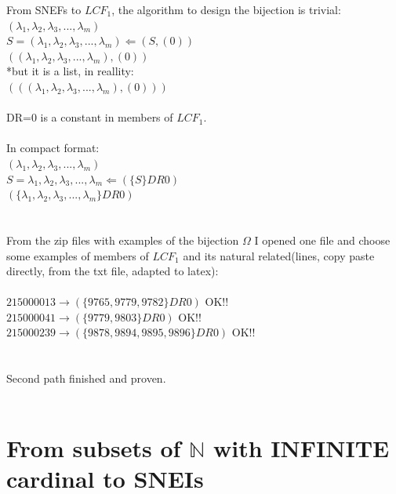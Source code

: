 		\noindent
		From SNEFs to $LCF_{1}$, the algorithm to design the bijection is trivial:\\
		$(\lambda_{1}, \lambda_{2}, \lambda_{3}, ..., \lambda_{m})$\\
		$ S=(\lambda_{1}, \lambda_{2}, \lambda_{3}, ..., \lambda_{m})  \Longleftarrow (S,(0))  $\\
		$(  (\lambda_{1}, \lambda_{2}, \lambda_{3}, ..., \lambda_{m}), (0) )$\\
		*but it is a list, in reallity:\\
		$(  (  (\lambda_{1}, \lambda_{2}, \lambda_{3}, ..., \lambda_{m}), (0) ) )$\\\\
		DR=0 is a constant in members of $LCF_{1}$.
		\\\\
		
		\noindent
		In compact format:\\
		$(\lambda_{1}, \lambda_{2}, \lambda_{3}, ..., \lambda_{m})$\\
		$ S = \lambda_{1}, \lambda_{2}, \lambda_{3}, ..., \lambda_{m}   \Longleftarrow ( \{ S  \}DR0) $\\
		$ (\{\lambda_{1}, \lambda_{2}, \lambda_{3}, ..., \lambda_{m} \}DR0 )$\\
		\\\\
		
		\noindent
		From the zip files with examples of the bijection $\Omega$ I opened one file and choose some examples of members of $LCF_{1}$ and its natural related(lines, copy paste directly, from the txt file, adapted to latex):\\\\
		$215000013  \rightarrow (\{9765,9779,9782\}DR0)$ OK!! \\
		$215000041  \rightarrow (\{9779,9803\}DR0)$ OK!!\\
		$215000239  \rightarrow (\{9878,9894,9895,9896\}DR0)$ OK!!\\
		\\\\
		
		\noindent
		Second path finished and proven.
		\\\\
		
	\section{ From subsets of $\mathbb{N}$ with INFINITE cardinal to SNEIs }
	
